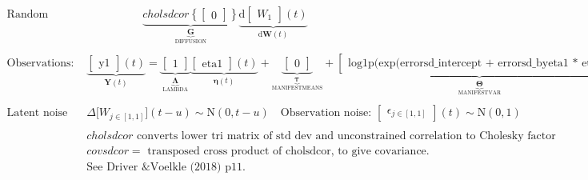 \documentclass[a4paper]{article}
\newcommand{\vect}[1]{\boldsymbol{\mathbf{#1}}}
\begin{document}
\begin{footnotesize}
\begin{align*}
    \textrm{Random change: }
    & \qquad \qquad \quad \underbrace{cholsdcor\left\{
      \begin{bmatrix}
0
\end{bmatrix}\right\}
    }_{\underbrace{\vect{G}}_\textrm{DIFFUSION}}
    \underbrace{\mathrm{d}
      \begin{bmatrix}
W_{1}
\end{bmatrix} 
      (t)}_{\mathrm{d} \vect{W}(t)} \\ \\
              \textrm{Observations: }
&\underbrace{
      \begin{bmatrix}
\text{y1}
\end{bmatrix}  
      (t)}_{\vect{Y}(t)} = 
        \underbrace{
          \begin{bmatrix}
1
\end{bmatrix} 
        }_{\underbrace{\vect{\Lambda}}_\textrm{LAMBDA}} \underbrace{
          \begin{bmatrix}
\text{eta1}
\end{bmatrix} 
          (t)}_{\vect{\eta}(t)} +
        \underbrace{
          \begin{bmatrix}
0
\end{bmatrix} 
        }_{\underbrace{\vect{\tau}}_\textrm{MANIFESTMEANS}} + 
              \underbrace{
                \begin{bmatrix}
\text{log1p(exp(errorsd\_intercept + errorsd\_byeta1 * eta1))}
\end{bmatrix}  
              }_{\underbrace{\vect{\Theta}}_\textrm{MANIFESTVAR}}
              \underbrace{
          \begin{bmatrix}
\epsilon_{1}
\end{bmatrix} 
          (t)}_{\vect{\epsilon}(t)} \\ \\
                \textrm{Latent noise per time step : }
          &\Delta \big[W_{j \in [1,1]}\big](t-u)   \sim  \mathrm{N}(0,t-u) \quad
              \textrm{Observation noise: }
            \begin{bmatrix}
\epsilon_{j \in [1,1]}
\end{bmatrix} 
            (t) \sim  \mathrm{N}(0,1) \\ \\
&cholsdcor\textrm{ converts lower tri matrix of std dev and unconstrained correlation to Cholesky factor covariance.} \\
&covsdcor =\textrm{ transposed cross product of cholsdcor, to give covariance.} \\
&\textrm{See Driver \& Voelkle (2018) p11.}
      \end{align*}
      \end{footnotesize}
      
\end{document}
